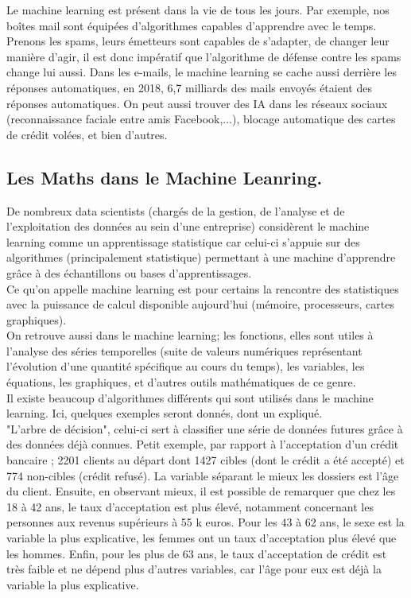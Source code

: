 \documentclass[a4paper, 12pt]{article}
\numberwithin{equation}{subsection}
\begin{document}
Le machine learning est présent dans la vie de tous les jours. Par exemple, nos boîtes mail sont équipées d'algorithmes capables d’apprendre avec le temps. Prenons les spams, leurs émetteurs sont capables de s'adapter, de changer leur manière d’agir, il est donc impératif que l’algorithme de défense contre les spams change lui aussi. Dans les e-mails, le machine learning se cache aussi derrière les réponses automatiques, en 2018, 6,7 milliards des mails envoyés étaient des réponses automatiques. On peut aussi trouver des IA dans les réseaux sociaux (reconnaissance faciale entre amis Facebook,...), blocage automatique des cartes de crédit volées, et bien d'autres.\\

\subsection{Les Maths dans le Machine Leanring.}

De nombreux data scientists (chargés de la gestion, de l’analyse et de l’exploitation des données au sein d’une entreprise) considèrent le machine learning comme un apprentissage statistique car celui-ci s’appuie sur des algorithmes (principalement statistique) permettant à une machine d'apprendre grâce à des échantillons ou bases d’apprentissages.\\

Ce qu’on appelle machine learning est pour certains la rencontre des statistiques avec la puissance de calcul disponible aujourd’hui (mémoire, processeurs, cartes graphiques).\\

On retrouve aussi dans le machine learning; les fonctions, elles sont utiles à l’analyse des séries temporelles (suite de valeurs numériques représentant l’évolution d’une quantité spécifique au cours du temps), les variables, les équations, les graphiques, et d’autres outils mathématiques de ce genre.\\[1cm]

Il existe beaucoup d'algorithmes différents qui sont utilisés dans le machine learning. Ici, quelques exemples seront donnés, dont un expliqué.\\

"L'arbre de décision", celui-ci sert à classifier une série de données futures grâce à des données déjà connues. Petit exemple, par rapport à l'acceptation d'un crédit bancaire ; 2201 clients au départ dont 1427 cibles (dont le crédit a été accepté) et 774 non-cibles (crédit refusé). La variable séparant le mieux les dossiers est l'âge du client. Ensuite, en observant mieux, il est possible de remarquer que chez les 18 à 42 ans, le taux d'acceptation est plus élevé, notamment concernant les personnes aux revenus supérieurs à 55 k euros. Pour les 43 à 62 ans, le sexe est la variable la plus explicative, les femmes ont un taux d'acceptation plus élevé que les hommes. Enfin, pour les plus de 63 ans, le taux d'acceptation de crédit est très faible et ne dépend plus d'autres variables, car l'âge pour eux est déjà la variable la plus explicative.\\
\end{document}
